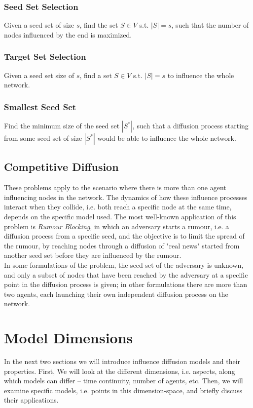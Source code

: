 \documentclass[twocolumn, 10pt]{article}
\begin{document}
\subsubsection{Seed Set Selection}
Given a seed set of size $s$, find the set $S \in V$ s.t. $|S| = s$, such that the number of nodes influenced by the end is maximized.
\subsubsection{Target Set Selection}
Given a seed set size of $s$, find a set $S \in V$ s.t. $|S| = s$ to influence the whole network.
\subsubsection {Smallest Seed Set}
Find the minimum size of the seed set $|S^*|$, such that a diffusion process starting from some seed set of size $|S^*|$ would be able to influence the whole network.
\subsection{Competitive Diffusion}
These problems apply to the scenario where there is more than one agent influencing nodes in the network. The dynamics of how these influence processes interact when they collide, i.e. both reach a specific node at the same time, depends on the specific model used. The most well-known application of this problem is \textit{Rumour Blocking}, in which an adversary starts a rumour, i.e. a diffusion process from a specific seed, and the objective is to limit the spread of the rumour, by reaching nodes through a diffusion of "real news" started from another seed set before they are influenced by the rumour. \\
In some formulations of the problem, the seed set of the adversary is unknown, and only a subset of nodes that have been reached by the adversary at a specific point in the diffusion process is given; in other formulations there are more than two agents, each launching their own independent diffusion process on the network.
\section{Model Dimensions}
In the next two sections we will introduce influence diffusion models and their properties. First, We will look at the different dimensions, i.e. aspects, along which models can differ -- time continuity, number of agents, etc. Then, we will examine specific models, i.e. points in this dimension-space, and briefly discuss their applications.
\end{document}
